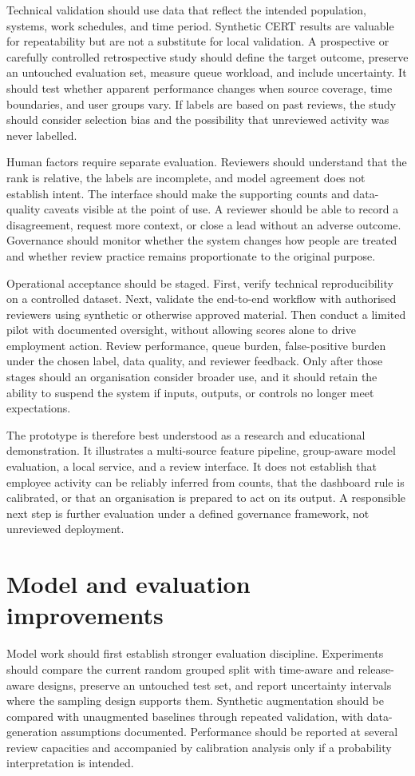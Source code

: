Technical validation should use data that reflect the intended
population, systems, work schedules, and time period. Synthetic CERT
results are valuable for repeatability but are not a substitute for
local validation. A prospective or carefully controlled retrospective
study should define the target outcome, preserve an untouched evaluation
set, measure queue workload, and include uncertainty. It should test
whether apparent performance changes when source coverage, time
boundaries, and user groups vary. If labels are based on past reviews,
the study should consider selection bias and the possibility that
unreviewed activity was never labelled.

Human factors require separate evaluation. Reviewers should understand
that the rank is relative, the labels are incomplete, and model
agreement does not establish intent. The interface should make the
supporting counts and data-quality caveats visible at the point of use.
A reviewer should be able to record a disagreement, request more
context, or close a lead without an adverse outcome. Governance should
monitor whether the system changes how people are treated and whether
review practice remains proportionate to the original purpose.

Operational acceptance should be staged. First, verify technical
reproducibility on a controlled dataset. Next, validate the end-to-end
workflow with authorised reviewers using synthetic or otherwise
approved material. Then conduct a limited pilot with documented
oversight, without allowing scores alone to drive employment action.
Review performance, queue burden, false-positive burden under the
chosen label, data quality, and reviewer feedback. Only after those
stages should an organisation consider broader use, and it should
retain the ability to suspend the system if inputs, outputs, or
controls no longer meet expectations.

The prototype is therefore best understood as a research and
educational demonstration. It illustrates a multi-source feature
pipeline, group-aware model evaluation, a local service, and a review
interface. It does not establish that employee activity can be
reliably inferred from counts, that the dashboard rule is calibrated,
or that an organisation is prepared to act on its output. A responsible
next step is further evaluation under a defined governance framework,
not unreviewed deployment.

\section{Model and evaluation improvements}
Model work should first establish stronger evaluation discipline.
Experiments should compare the current random grouped split with
time-aware and release-aware designs, preserve an untouched test set,
and report uncertainty intervals where the sampling design supports
them. Synthetic augmentation should be compared with unaugmented
baselines through repeated validation, with data-generation
assumptions documented. Performance should be reported at several
review capacities and accompanied by calibration analysis only if a
probability interpretation is intended.

